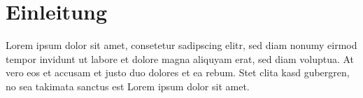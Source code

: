 \section{Einleitung}

Lorem ipsum dolor sit amet, consetetur sadipscing elitr, sed diam nonumy eirmod tempor invidunt ut labore et dolore magna aliquyam erat, sed diam voluptua. At vero eos et accusam et justo duo dolores et ea rebum. Stet clita kasd gubergren, no sea takimata sanctus est Lorem ipsum dolor sit amet.








